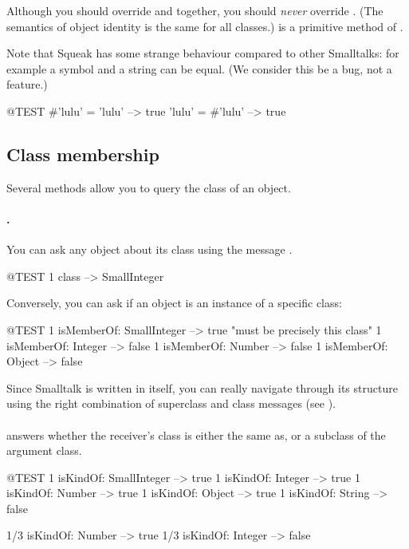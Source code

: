 \documentclass[a4paper,10pt,twoside]{book}
\begin{document}
Although you should override \ct{=} and  together, you should \emph{never} override \ct{==}. (The semantics of object identity is the same for all classes.)  \ct{==} is a primitive method of .

Note that Squeak has some strange behaviour compared to other Smalltalks: for example a symbol and a string can be equal. (We consider this be a bug, not a feature.)

\begin{code}{@TEST}
#'lulu' = 'lulu' --> true
'lulu' = #'lulu' --> true
\end{code}


\subsection{Class membership}
Several methods allow you to query the class of an object. 

\paragraph{.} You can ask any object about its class using the message .
\begin{code}{@TEST}
1 class --> SmallInteger
\end{code}

Conversely, you can ask if an object is an instance of a specific class:
\begin{code}{@TEST}
1 isMemberOf: SmallInteger --> true    "must be precisely this class"
1 isMemberOf: Integer          --> false
1 isMemberOf: Number        --> false
1 isMemberOf: Object           --> false
\end{code}

Since Smalltalk is written in itself, you can really navigate through its structure using the right combination of superclass and class messages (see ). 

\paragraph{}
 answers whether the receiver's class is either the same as, or a subclass of the argument class.

\begin{code}{@TEST}
1 isKindOf: SmallInteger --> true
1 isKindOf: Integer          --> true
1 isKindOf: Number         --> true
1 isKindOf: Object           --> true
1 isKindOf: String            --> false

1/3 isKindOf: Number      --> true
1/3 isKindOf: Integer        --> false
\end{code}
\end{document}
